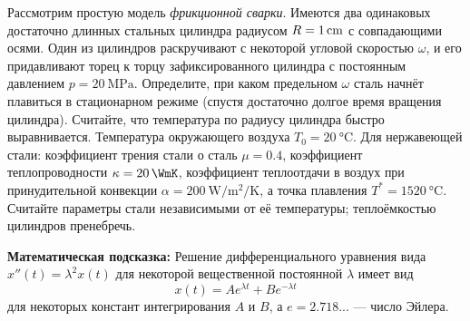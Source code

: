 
Рассмотрим простую модель \textit{фрикционной сварки}. Имеются два одинаковых достаточно длинных стальных цилиндра радиусом $R=\qty1{\cm}$ с совпадающими осями. Один из цилиндров раскручивают с некоторой угловой скоростью $\omega$, и его придавливают торец к торцу зафиксированного цилиндра с постоянным давлением $p=\qty{20}{\MPa}$. Определите, при каком предельном $\omega$ сталь начнёт плавиться в стационарном режиме (спустя достаточно долгое время вращения цилиндра). Считайте, что температура по радиусу цилиндра быстро выравнивается. Температура окружающего воздуха $T_0=\qty{20}{\celsius}$. Для нержавеющей стали: коэффициент трения стали о сталь $\mu=0.4$, коэффициент теплопроводности $\kappa=\qty{20}{\WmK}$, коэффициент теплоотдачи в воздух при принудительной конвекции $\alpha=\qty{200}{\W\per\metre\squared\per\kelvin}$, а точка плавления $T^*=\qty{1520}{\celsius}$. Считайте параметры стали независимыми от её температуры; теплоёмкостью цилиндров пренебречь.

\textbf{Математическая подсказка:} Решение дифференциального уравнения вида $x''(t) = \lambda^2 x(t)$ для некоторой вещественной постоянной $\lambda$ имеет вид
$$
x(t) = Ae^{\lambda t} + Be^{-\lambda t}
$$
для некоторых констант интегрирования $A$ и $B$, а $e=2.718...$ --- число Эйлера.
